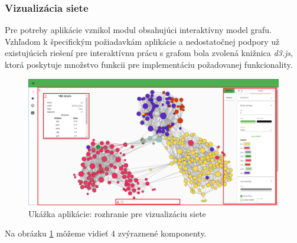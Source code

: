 \documentclass[slovak,master,dept460,male,cpp,cpdeclaration]{diploma}
\begin{document}
\subsubsection{Vizualizácia siete}
\label{network_visualziation} Pre potreby aplikácie vznikol modul obsahujúci interaktívny model grafu. Vzhľadom k špecifickým požiadavkám aplikácie a nedostatočnej podpory už existujúcich riešení pre interaktívnu prácu s grafom bola zvolená knižnica \textit{d3.js}, ktorá poskytuje množstvo funkcii pre implementáciu požadovanej funkcionality.
\begin{figure}[H]
\centering
\includegraphics[width=\textwidth]{ecoli_graph_numbers.png}
\caption{Ukážka aplikácie: rozhranie pre vizualizáciu siete}
\label{pic:graph_vizualization}
\end{figure} 
Na obrázku \ref{pic:graph_vizualization} môžeme vidieť 4 zvýraznené komponenty.
\end{document}
